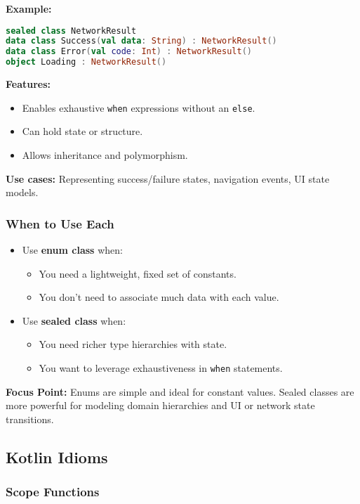 \documentclass[a4paper,12pt]{article}
\begin{document}
\textbf{Example:}
\begin{lstlisting}[language=Kotlin]
sealed class NetworkResult
data class Success(val data: String) : NetworkResult()
data class Error(val code: Int) : NetworkResult()
object Loading : NetworkResult()
\end{lstlisting}

\textbf{Features:}
\begin{itemize}
  \item Enables exhaustive \texttt{when} expressions without an \texttt{else}.
  \item Can hold state or structure.
  \item Allows inheritance and polymorphism.
\end{itemize}

\textbf{Use cases:} Representing success/failure states, navigation events, UI state models.

\subsubsection{When to Use Each}

\begin{itemize}
  \item Use \textbf{enum class} when:
    \begin{itemize}
      \item You need a lightweight, fixed set of constants.
      \item You don’t need to associate much data with each value.
    \end{itemize}
  \item Use \textbf{sealed class} when:
    \begin{itemize}
      \item You need richer type hierarchies with state.
      \item You want to leverage exhaustiveness in \texttt{when} statements.
    \end{itemize}
\end{itemize}

\textbf{Focus Point:} Enums are simple and ideal for constant values. Sealed classes are more powerful for modeling domain hierarchies and UI or network state transitions.


\subsection{Kotlin Idioms}

\subsubsection{Scope Functions}
\end{document}
